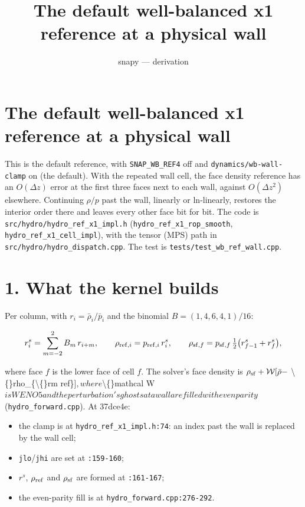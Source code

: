 \documentclass[11pt,a4paper]{article}
\title{The default well-balanced x1 reference at a physical wall}
\author{snapy --- derivation}\date{}
\begin{document}
\maketitle
\section*{The default well-balanced x1 reference at a physical wall}

This is the default reference, with \texttt{SNAP\_WB\_REF4} off and \texttt{dynamics/wb-wall-clamp} on (the default). With the
repeated wall cell, the face density reference has an $O(\Delta z)$ error at the first three faces next to each
wall, against $O(\Delta z^2)$ elsewhere. Continuing $\rho/p$ past the wall, linearly or ln-linearly, restores the
interior order there and leaves every other face bit for bit. The code is \texttt{src/hydro/hydro\_ref\_x1\_impl.h}
(\texttt{hydro\_ref\_x1\_rop\_smooth}, \texttt{hydro\_ref\_x1\_cell\_impl}), with the tensor (MPS) path in
\texttt{src/hydro/hydro\_dispatch.cpp}. The test is \texttt{tests/test\_wb\_ref\_wall.cpp}.

\section*{1. What the kernel builds}

Per column, with $r_i = \bar\rho_i/\bar p_i$ and the binomial $B = (1, 4, 6, 4, 1)/16$:

\begin{equation*}
r^s_i = \sum_{m=-2}^{2} B_m\, r_{i+m},\qquad
\rho_{{\rm ref},i} = p_{{\rm ref},i}\, r^s_i,\qquad
\rho_{{\rm sf},f} = p_{{\rm sf},f}\,\tfrac12\big(r^s_{f-1} + r^s_f\big),
\end{equation*}

where face $f$ is the lower face of cell $f$. The solver's face density is $\rho_{\rm sf} + \mathcal W[\bar\rho -$
\textbackslash\{\}rho\_\{\textbackslash\{\}rm ref\}]$, where $\textbackslash\{\}mathcal W$ is WENO5 and the perturbation's ghosts at a wall are filled with even parity$
(\texttt{hydro\_forward.cpp}). At 37dce4e:
\begin{itemize}
\item the clamp is at \texttt{hydro\_ref\_x1\_impl.h:74}: an index past the wall is replaced by the wall cell;
\item \texttt{jlo}/\texttt{jhi} are set at \texttt{:159-160};
\item $r^s$, $\rho_{\rm ref}$ and $\rho_{\rm sf}$ are formed at \texttt{:161-167};
\item the even-parity fill is at \texttt{hydro\_forward.cpp:276-292}.
\end{itemize}
\end{document}
